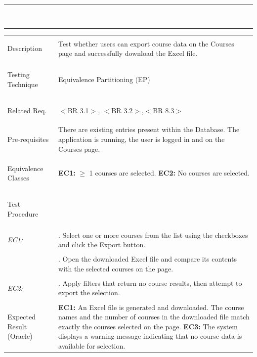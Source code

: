 {
\small
\renewcommand{\arraystretch}{0.9}

\vspace{8pt}
\noindent\rule{\linewidth}{0.85pt}

\\[-4pt]
\noindent\rule{\linewidth}{0.45pt}

\begin{longtable}{@{} >{\bfseries\raggedright\arraybackslash}p{} >{\raggedright\arraybackslash}p{} @{}}
Description & Test whether users can export course data on the Courses page and successfully download the Excel file. \\[2pt]

Testing Technique & Equivalence Partitioning (EP) \\[2pt]

Related Req.  &$<$BR 3.1$>$,  $<$BR 3.2$>$,$<$BR 8.3$>$  \\[2pt]

Pre-requisites & There are existing entries present within the Database. The application is running, the user is logged in and on the Courses page. \\[2pt]

Equivalence Classes   & \textbf{EC1:} $\geq$ 1 courses are selected.
  \newline \textbf{EC2:} No courses are selected. \\

Test Procedure & \\
\quad\textit{EC1: } & 1. Select one or more courses from the list using the checkboxes and click the Export button. \\[2pt]
\quad\textit{} & 2. Open the downloaded Excel file and compare its contents with the selected courses on the page. \\[2pt]
\quad\textit{EC2: } & 3. Apply filters that return no course results, then attempt to export the selection. \\[2pt]


Expected Result (Oracle) & \textbf{EC1:} An Excel file is generated and downloaded. The course names and the number of courses in the downloaded file match exactly the courses selected on the page. \newline
\textbf{EC3:} The system displays a warning message indicating that no course data is available for selection. \\[2pt] \hline


\end{longtable}}
